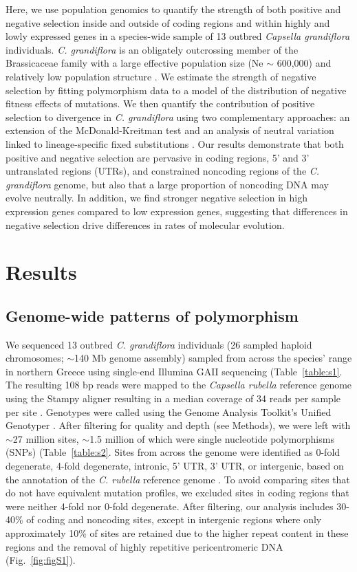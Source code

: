 Here, we use population genomics to quantify the strength of both positive and negative selection inside and outside of coding regions and within highly and lowly expressed genes in a species-wide sample of 13 outbred \textit{Capsella grandiflora} individuals. \textit{C. grandiflora} is an obligately outcrossing member of the Brassicaceae family with a large effective population size (Ne $\sim$ 600,000) and relatively low population structure \citep{gossmann2010,St_onge2011-jz}. We estimate the strength of negative selection by fitting polymorphism data to a model of the distribution of negative fitness effects of mutations. We then quantify the contribution of positive selection to divergence in \textit{C. grandiflora} using two complementary approaches: an extension of the McDonald-Kreitman test \citep{eyre2009} and an analysis of neutral variation linked to lineage-specific fixed substitutions \citep{sella2009}. Our results demonstrate that both positive and negative selection are pervasive in coding regions, 5’ and 3’ untranslated regions (UTRs), and constrained noncoding regions of the \textit{C. grandiflora} genome, but also that a large proportion of noncoding DNA may evolve neutrally. In addition, we find stronger negative selection in high expression genes compared to low expression genes, suggesting that differences in negative selection drive differences in rates of molecular evolution.

\section{Results}
\subsection{Genome-wide patterns of polymorphism}

We sequenced 13 outbred \textit{C. grandiflora} individuals (26 sampled haploid chromosomes; $\sim$140 Mb genome assembly) sampled from across the species' range in northern Greece using single-end Illumina GAII sequencing (Table~\ref{table:s1}. The resulting 108 bp reads were mapped to the \textit{Capsella rubella} reference genome \citep{Slotte2013-py} using the Stampy aligner resulting in a median coverage of 34 reads per sample per site \citep{Lunter2011-uc}. Genotypes were called using the Genome Analysis Toolkit’s Unified Genotyper \citep{gatk}. After filtering for quality and depth (see Methods), we were left with $\sim$27 million sites, $\sim$1.5 million of which were single nucleotide polymorphisms (SNPs) (Table~\ref{table:s2}. Sites from across the genome were identified as 0-fold degenerate, 4-fold degenerate, intronic, 5’ UTR, 3’ UTR, or intergenic, based on the annotation of the \textit{C. rubella} reference genome \citep{Slotte2013-py}. To avoid comparing sites that do not have equivalent mutation profiles, we excluded sites in coding regions that were neither 4-fold nor 0-fold degenerate. After filtering, our analysis includes 30-40\% of coding and noncoding sites, except in intergenic regions where only approximately 10\% of sites are retained due to the higher repeat content in these regions and the removal of highly repetitive pericentromeric DNA (Fig.~\ref{fig:figS1}). 


